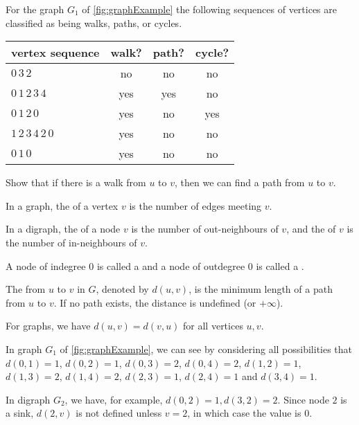 \begin{Example}
For the graph $G_1$ of \cref{fig:graphExample} the following
sequences of vertices are classified as being walks, paths, or cycles.

\medskip

\begin{center}
\begin{tabular}{|l|c|c|c|}\hline
\textbf{vertex sequence} & \textbf{walk?} & \textbf{path?} & \textbf{cycle?} \\ \hline
$0\, 3\, 2$                  & no & no & no  \\
$0\, 1\, 2\, 3\, 4$          & yes & yes & no  \\
$0\, 1\,  2\,  0$            & yes & no & yes  \\
$1\,  2\,  3\,  4\,  2\,  0$ & yes & no & no \\
$0 \, 1\,  0$                & yes & no & no \\
\hline
\end{tabular}
\end{center}
\end{Example}

\begin{Boxample}[8]
Show that if there is a walk from $u$ to $v$, then we can find a path from $u$ to $v$.
\end{Boxample}


\begin{Definition} 
In a graph, the  of a vertex $v$ is the number of edges meeting $v$. 

In a digraph, the  of a node $v$ is the number of out-neighbours of $v$, 
and the  of $v$ is the number of in-neighbours of $v$.

A node of indegree $0$ is called a  and a node of outdegree $0$ is called a .
\end{Definition}


\begin{Definition}
The  from $u$ to $v$ in $G$, denoted by $d(u,v)$, is 
the minimum length of a path from $u$ to $v$. If no path exists, the 
distance is undefined (or $+\infty$).
\end{Definition}

For graphs, we have $d(u,v) = d(v,u)$ for all vertices $u, v$. 

\begin{Example}
In graph $G_1$ of \cref{fig:graphExample}, we can see by considering
all possibilities that $d(0, 1) = 1$, $d(0, 2) = 1$, $d(0, 3) = 2$,
$d(0, 4) = 2$, $d(1, 2) = 1$, $d(1, 3) = 2$, $d(1, 4) = 2$, $d(2, 3) =
1$, $d(2, 4) = 1$ and $d(3, 4) = 1$.

In digraph $G_2$, we have, for example, $d(0, 2) = 1, d(3, 2) = 2$. 
Since node $2$ is a sink, $d(2, v)$ is not defined unless $v = 2$, in which case the value is $0$.
\end{Example}



